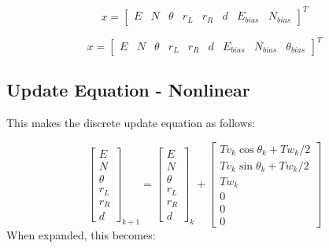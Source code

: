 \documentclass[11pt]{amsart}
\begin{document}
\begin{equation}
x = \begin{bmatrix}
E & N & \theta & r_L & r_R & d & E_{bias} & N_{bias}
\end{bmatrix}^T
\end{equation}

\begin{equation}
x = \begin{bmatrix}
E & N & \theta & r_L & r_R & d & E_{bias} & N_{bias} & \theta_{bias}
\end{bmatrix}^T
\end{equation}

\subsection{Update Equation - Nonlinear}
This makes the discrete update equation as follows:

\begin{equation}
\begin{bmatrix}
E \\ N \\ \theta \\ r_L \\ r_R \\ d 
\end{bmatrix}_{k+1} = 
\begin{bmatrix}
E \\ N \\ \theta \\ r_L \\ r_R \\ d
\end{bmatrix}_{k} +
\begin{bmatrix}
T v_k \cos{\theta_k + T w_k/2} \\
T v_k \sin{\theta_k + T w_k/2} \\
T w_k \\ 0 \\ 0 \\ 0
\end{bmatrix} 
 \end{equation}
When expanded, this becomes:
\end{document}
